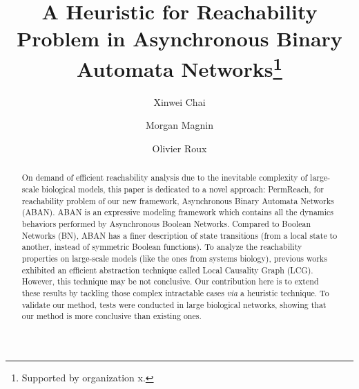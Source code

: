 \documentclass[runningheads]{llncs}
\begin{document}
%
\title{A Heuristic for Reachability Problem in Asynchronous Binary Automata Networks\thanks{Supported by organization x.}}
%
%
\author{Xinwei Chai\and Morgan Magnin \and Olivier Roux}
%
%
%
\maketitle              %
%
\begin{abstract}
On demand of efficient reachability analysis due to the inevitable complexity of large-scale biological models, this paper is dedicated to a novel approach: PermReach, for reachability problem of our new framework, Asynchronous Binary Automata Networks (ABAN). ABAN is an expressive modeling framework which contains all the dynamics behaviors performed by Asynchronous Boolean Networks. Compared to Boolean Networks (BN), ABAN has a finer description of state transitions (from a local state to another, instead of symmetric Boolean functions). To analyze the reachability properties on large-scale models (like the ones from systems biology), previous works exhibited an efficient abstraction technique called Local Causality Graph (LCG). However, this technique may be not conclusive. Our contribution here is to extend these results by tackling those complex intractable cases \textit{via} a heuristic technique. To validate our method, tests were conducted in large biological networks, showing that our method is more conclusive than existing ones.
\cite{marx2013}

\end{abstract}
\end{document}
